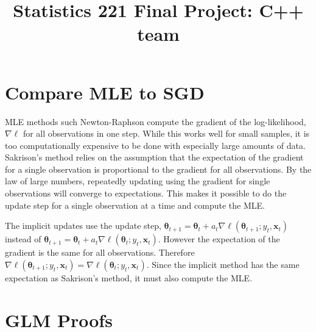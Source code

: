 \documentclass{article}
\title{Statistics 221 Final Project: C++ team}
\renewcommand{\vec}[1]{\boldsymbol{#1}}
\begin{document}
\maketitle

\section{Compare MLE to SGD}
MLE methods such Newton-Raphson compute the gradient of the log-likelihood, $\nabla\ell$ for all observations in one step. While this works well for small samples, it is too computationally expensive to be done with especially large amounts of data. Sakrison's method relies on the assumption that the expectation of the gradient for a single observation is proportional to the gradient for all observations. By the law of large numbers, repeatedly updating using the gradient for single observations will converge to expectations. This makes it possible to do the update step for a single observation at a time and compute the MLE.

The implicit updates use the update step, $\vec{\theta}_{t+1} = \vec{\theta}_t + a_t\nabla\ell(\vec{\theta}_{t+1}; y_t, \vec{x}_t)$ instead of $\vec{\theta}_{t+1} = \vec{\theta}_t + a_t\nabla\ell(\vec{\theta}_{t}; y_t, \vec{x}_t)$. However the expectation of the gradient is the same for all observations. Therefore $\nabla\ell(\vec{\theta}_{t+1}; y_t, \vec{x}_t) = \nabla\ell(\vec{\theta}_{t}; y_t, \vec{x}_t)$. Since the implicit method has the same expectation as Sakrison's method, it must also compute the MLE.


\section{GLM Proofs}
\end{document}
